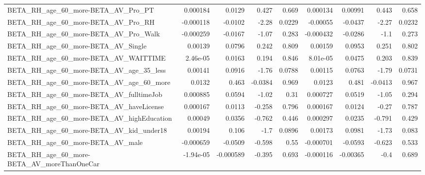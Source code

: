 \begin{tabular}{lrrrrrrrr}
BETA\_RH\_age\_60\_more-BETA\_AV\_Pro\_PT                 &    0.000184 &       0.0129 &    0.427 &    0.669 &   0.000134 &     0.00991 &        0.443 &         0.658 \\
BETA\_RH\_age\_60\_more-BETA\_AV\_Pro\_RH                 &   -0.000118 &      -0.0102 &    -2.28 &   0.0229 &   -0.00055 &     -0.0437 &        -2.27 &        0.0232 \\
BETA\_RH\_age\_60\_more-BETA\_AV\_Pro\_Walk               &   -0.000259 &      -0.0167 &    -1.07 &    0.283 &  -0.000432 &     -0.0286 &         -1.1 &         0.273 \\
BETA\_RH\_age\_60\_more-BETA\_AV\_Single                 &     0.00139 &       0.0796 &    0.242 &    0.809 &    0.00159 &      0.0953 &        0.251 &         0.802 \\
BETA\_RH\_age\_60\_more-BETA\_AV\_WAITTIME               &    2.46e-05 &       0.0163 &    0.194 &    0.846 &   8.01e-05 &      0.0475 &        0.203 &         0.839 \\
BETA\_RH\_age\_60\_more-BETA\_AV\_age\_35\_less            &     0.00141 &       0.0916 &    -1.76 &   0.0788 &    0.00115 &      0.0763 &        -1.79 &        0.0731 \\
BETA\_RH\_age\_60\_more-BETA\_AV\_age\_60\_more            &      0.0132 &        0.463 &  -0.0384 &    0.969 &     0.0123 &       0.481 &      -0.0413 &         0.967 \\
BETA\_RH\_age\_60\_more-BETA\_AV\_fulltimeJob            &    0.000885 &       0.0594 &    -1.02 &     0.31 &   0.000727 &      0.0519 &        -1.05 &         0.294 \\
BETA\_RH\_age\_60\_more-BETA\_AV\_haveLicense            &    0.000167 &       0.0113 &   -0.258 &    0.796 &   0.000167 &      0.0124 &        -0.27 &         0.787 \\
BETA\_RH\_age\_60\_more-BETA\_AV\_highEducation          &     0.00049 &       0.0356 &   -0.762 &    0.446 &   0.000297 &      0.0235 &       -0.791 &         0.429 \\
BETA\_RH\_age\_60\_more-BETA\_AV\_kid\_under18            &     0.00194 &        0.106 &     -1.7 &   0.0896 &    0.00173 &      0.0981 &        -1.73 &         0.083 \\
BETA\_RH\_age\_60\_more-BETA\_AV\_male                   &   -0.000659 &      -0.0509 &   -0.598 &     0.55 &  -0.000701 &     -0.0593 &       -0.623 &         0.533 \\
BETA\_RH\_age\_60\_more-BETA\_AV\_moreThanOneCar         &   -1.94e-05 &    -0.000589 &   -0.395 &    0.693 &  -0.000116 &    -0.00365 &         -0.4 &         0.689 \\

\end{tabular}
